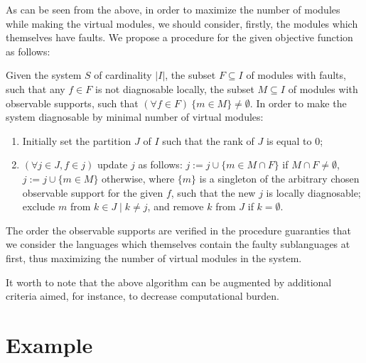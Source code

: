 \documentclass[a4paper, 10pt, conference]{ieeeconf}
\begin{document}
As can be seen from the above, in order to maximize the number of modules while
making the virtual modules, we should consider, firstly, the modules which
themselves have faults. We propose a procedure for the given objective function
as follows:

Given the system $S$ of cardinality $|I|$, the subset $F
\subseteq I$ of modules with faults, such that any $f\in F$ is not diagnosable
locally, the subset $M \subseteq I$ of modules with observable supports, such
that $(\forall f \in F)~\{m \in M\}\neq \emptyset$. In order to make the system
diagnosable by minimal number of virtual modules: 
\begin{enumerate}
  \item Initially set the partition $J$ of $I$ such that the rank of $J$ is
  equal to 0;
  \item $(\forall j \in J, f \in j)$ update $j$ as follows: 
  	$j := j \cup \{m \in M \cap F\}$ if $M \cap F \neq \emptyset$,
 $j := j \cup \{m \in M\}$ otherwise, where $\{m\}$ is a singleton of the
 arbitrary chosen observable support for the given $f$, such that the new $j$
 is locally diagnosable; exclude $m$ from $k \in J \mid k \neq j$, and remove
 $k$ from $J$ if $k=\emptyset$.
\end{enumerate} 
The order the observable supports are verified in the procedure guaranties that
we consider the languages which themselves contain the faulty
sublanguages at first, thus maximizing the number of virtual modules in the
system.

It worth to note that the above algorithm can be augmented by additional
criteria aimed, for instance, to decrease computational burden.




\section{Example}
\label{sec:Example}
\end{document}
